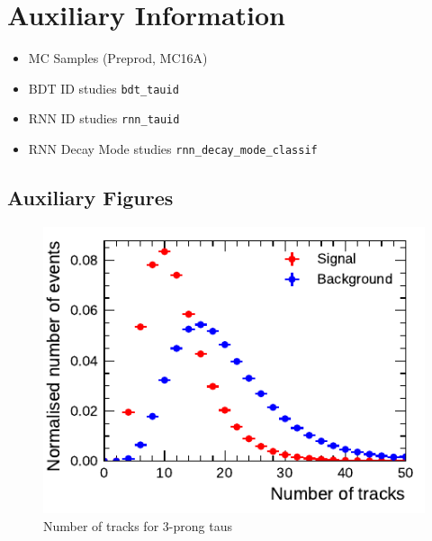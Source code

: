 \chapter{Auxiliary Information}
\label{sec:app}

\begin{itemize}
\item MC Samples (Preprod, MC16A)
\item BDT ID studies \texttt{bdt\_tauid}
\item RNN ID studies \texttt{rnn\_tauid}
\item RNN Decay Mode studies \texttt{rnn\_decay\_mode\_classif}
\end{itemize}


\section{Auxiliary Figures}

\begin{figure}[htpb]
  \centering
  \includegraphics{./figures/rnn/ntrk_3p.pdf}
  \caption{Number of tracks for 3-prong taus}
  \label{fig:total_tracks_3p}
\end{figure}

